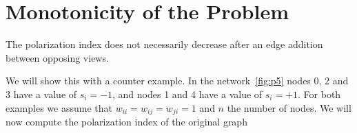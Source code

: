 \section{Monotonicity of the Problem}
\label{sec:monotonicity}

\begin{lemma}
The polarization index does not necessarily decrease after an edge addition between opposing views.
\end{lemma}

\vspace{20pt}
\noindent We will  show this with a counter example. In the network~\ref{fig:p5} nodes 0, 2 and 3 have a value of $s_i=-1$, and nodes 1 and 4 have a value of $s_i=+1$. For both examples we assume that $w_{ii}=w_{ij}=w_{ji}=1$ and $n$ the number of nodes. We will now compute the polarization index of the original graph
\\
